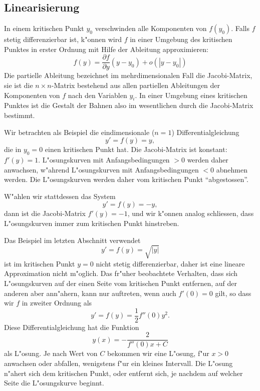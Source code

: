 %
%
\subsection{Linearisierung}
%
In einem kritischen Punkt $y_0$ verschwinden alle Komponenten von $f(y_0)$.
Falls $f$ stetig differenzierbar ist, k"onnen wird $f$ in einer Umgebung
des kritischen Punktes in erster Ordnung mit Hilfe der Ableitung
approximieren:
\[
f(y)=\frac{\partial f}{\partial y}(y-y_0) + o(|y-y_0|)
\]
Die partielle Ableitung bezeichnet im mehrdimensionalen Fall
die Jacobi-Matrix, sie ist die $n\times n$-Matrix bestehend aus allen
partiellen Ableitungen der Komponenten von $f$ nach den Variablen $y_i$.
In einer Umgebung eines kritischen Punktes ist die Gestalt der Bahnen also
im wesentlichen durch die Jacobi-Matrix bestimmt.
%

\begin{beispiel}
Wir betrachten als Beispiel die eindimensionale ($n=1$) Differentialgleichung
\[
y'=f(y)=y,
\]
die in $y_0=0$ einen kritischen Punkt hat.
Die Jacobi-Matrix ist konstant: $f'(y)=1$.
L"osungskurven mit Anfangsbedingungen $>0$ werden daher anwachsen,
w"ahrend L"osungskurven mit Anfangsbedingungen $<0$ abnehmen werden.
Die L"osungskurven werden daher vom kritischen Punkt ``abgestossen''.

W"ahlen wir stattdessen das System
\[
y'=f(y)=-y,
\]
dann ist die Jacobi-Matrix $f'(y)=-1$, und wir k"onnen analog schliessen,
dass L"osungskurven immer zum kritischen Punkt hinstreben.
\end{beispiel}

\begin{beispiel}
Das Beispiel im letzten Abschnitt verwendet
\[
y'=f(y)=\sqrt{|y|}
\]
ist im kritischen Punkt $y=0$ nicht stetig differenzierbar, daher ist
eine lineare Approximation nicht m"oglich.
Das fr"uher beobachtete Verhalten, dass sich L"osungskurven auf der
einen Seite vom kritischen Punkt entfernen, auf der anderen aber ann"ahern,
kann nur auftreten, wenn auch $f'(0)=0$ gilt, so dass wir $f$ in zweiter
Ordnung als
\[
y'=f(y)=\frac12 f''(0)y^2.
\]
Diese Differentialgleichung hat die Funktion
\[
y(x)=-\frac{2}{f''(0)x+C}
\]
als L"osung.
Je nach Wert von $C$ bekommen wir eine L"osung, f"ur $x>0$ anwachsen
oder abfallen, wenigstens f"ur ein kleines Intervall.
Die L"osung n"ahert sich dem kritischen Punkt, oder entfernt sich, je
nachdem auf welcher Seite die L"osungskurve beginnt.
\end{beispiel}

